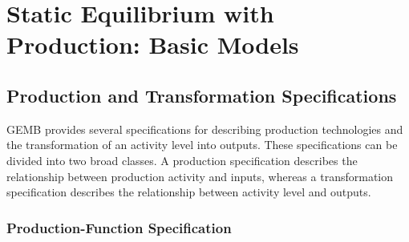 \documentclass[
  letterpaper,
  DIV=11,
  numbers=noendperiod]{scrreprt}
\newenvironment{Shaded}{\begin{snugshade}}{\end{snugshade}}
\newcommand{\ConstantTok}[1]{\textcolor[rgb]{0.56,0.35,0.01}{#1}}
\newcommand{\ControlFlowTok}[1]{\textcolor[rgb]{0.00,0.23,0.31}{\textbf{#1}}}
\newcommand{\FunctionTok}[1]{\textcolor[rgb]{0.28,0.35,0.67}{#1}}
\newcommand{\KeywordTok}[1]{\textcolor[rgb]{0.00,0.23,0.31}{\textbf{#1}}}
\newcommand{\NormalTok}[1]{\textcolor[rgb]{0.00,0.23,0.31}{#1}}
\newcommand{\OperatorTok}[1]{\textcolor[rgb]{0.37,0.37,0.37}{#1}}
\newcommand{\StringTok}[1]{\textcolor[rgb]{0.13,0.47,0.30}{#1}}
\begin{document}
%


\chapter{Static Equilibrium with Production: Basic
Models}\label{static-equilibrium-with-production-basic-models}

\section{Production and Transformation
Specifications}\label{production-and-transformation-specifications}

GEMB provides several specifications for describing production
technologies and the transformation of an activity level into outputs.
These specifications can be divided into two broad classes. A production
specification describes the relationship between production activity and
inputs, whereas a transformation specification describes the
relationship between activity level and outputs.

\subsection{Production-Function
Specification}\label{production-function-specification}
\end{document}
